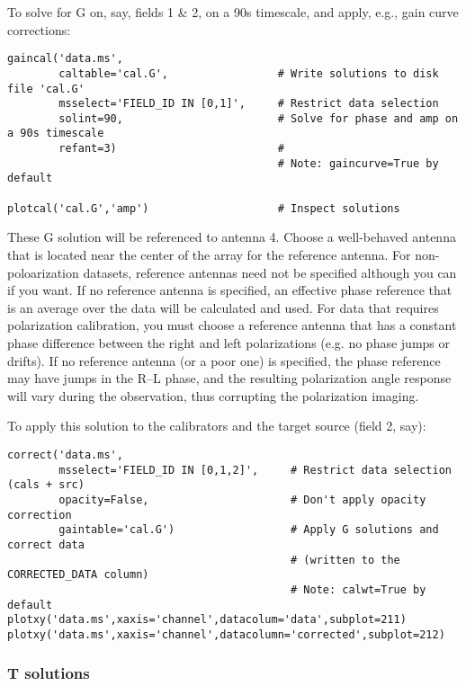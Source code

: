 To solve for G on, say, fields 1 \& 2, on a 90s timescale, and apply,
e.g., gain curve corrections:

\small
\begin{verbatim}
gaincal('data.ms',
        caltable='cal.G',                 # Write solutions to disk file 'cal.G'
        msselect='FIELD_ID IN [0,1]',     # Restrict data selection
        solint=90,                        # Solve for phase and amp on a 90s timescale
        refant=3)                         #
                                          # Note: gaincurve=True by default

plotcal('cal.G','amp')                    # Inspect solutions
\end{verbatim}
\normalsize

These G solution will be referenced to antenna 4.  Choose a
well-behaved antenna that is located near the center of the array for
the reference antenna.  For non-poloarization datasets, reference
antennas need not be specified although you can if you want.  If no
reference antenna is specified, an effective phase reference that is
an average over the data will be calculated and used.  For data that
requires polarization calibration, you must choose a reference antenna
that has a constant phase difference between the right and left
polarizations (e.g. no phase jumps or drifts).  If no reference
antenna (or a poor one) is specified, the phase reference may have
jumps in the R--L phase, and the resulting polarization angle response
will vary during the observation, thus corrupting the polarization
imaging.

To apply this solution to the calibrators and the target source (field
2, say):

\small
\begin{verbatim}
correct('data.ms',
        msselect='FIELD_ID IN [0,1,2]',     # Restrict data selection (cals + src)
        opacity=False,                      # Don't apply opacity correction
        gaintable='cal.G')                  # Apply G solutions and correct data
                                            # (written to the CORRECTED_DATA column)
                                            # Note: calwt=True by default
plotxy('data.ms',xaxis='channel',datacolum='data',subplot=211)
plotxy('data.ms',xaxis='channel',datacolumn='corrected',subplot=212)
\end{verbatim}
\normalsize


\subsubsection{T solutions}
\label{subsubsection:synth.t.solns}

